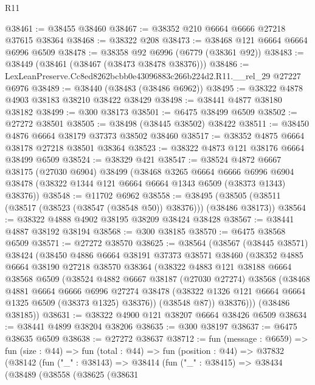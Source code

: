\begin{lexlean}{R11}
\begin{coremodule}
@38461 := @38455 @38460
@38467 := @38352 @210 @6664 @6666 @27218 @37615 @38364
@38468 := @38322 @208
@38473 := @38468 @121 @6664 @6664 @6996 @6509
@38478 := @38358 @92 @6996 (@6779 (@38361 @92))
@38483 := @38449 (@38461 (@38467 (@38473 @38478 @38376)))
@38486 := LexLeanPreserve.Cc8ed8262bcbb0e43096883c266b224d2.R11.__rel_29 @27227 @6976
@38489 := @38440 (@38483 (@38486 @6962))
@38495 := @38322 @4878 @4903 @38183 @38210 @38422 @38429
@38498 := @38441 @4877 @38180 @38182
@38499 := @300 @38173
@38501 := @6475 @38499 @6509
@38502 := @27272 @38501
@38505 := @38498 (@38445 @38502) @38422
@38511 := @38450 @4876 @6664 @38179 @37373 @38502 @38460
@38517 := @38352 @4875 @6664 @38178 @27218 @38501 @38364
@38523 := @38322 @4873 @121 @38176 @6664 @38499 @6509
@38524 := @38329 @421
@38547 := @38524
    @4872
    @6667
    @38175
    (@27030 @6904)
    @38499
    (@38468
      @3265
      @6664
      @6666
      @6996
      @6904
      @38478
      (@38322 @1344 @121 @6664 @6664 @1343 @6509 (@38373 @1343) @38376))
@38548 := @11702 @6962
@38558 := @38495 (@38505 (@38511 (@38517 (@38523 (@38547 (@38548 @50)) @38376))) (@38486 @38173))
@38564 := @38322 @4888 @4902 @38195 @38209 @38424 @38428
@38567 := @38441 @4887 @38192 @38194
@38568 := @300 @38185
@38570 := @6475 @38568 @6509
@38571 := @27272 @38570
@38625 := @38564
    (@38567
      (@38445 @38571)
      @38424
      (@38450
        @4886
        @6664
        @38191
        @37373
        @38571
        @38460
        (@38352
          @4885
          @6664
          @38190
          @27218
          @38570
          @38364
          (@38322
            @4883
            @121
            @38188
            @6664
            @38568
            @6509
            (@38524
              @4882
              @6667
              @38187
              (@27030 @27274)
              @38568
              (@38468
                @4881
                @6664
                @6666
                @6996
                @27274
                @38478
                (@38322 @1326 @121 @6664 @6664 @1325 @6509 (@38373 @1325) @38376))
              (@38548 @87))
            @38376)))
      (@38486 @38185))
@38631 := @38322 @4900 @121 @38207 @6664 @38426 @6509
@38634 := @38441 @4899 @38204 @38206
@38635 := @300 @38197
@38637 := @6475 @38635 @6509
@38638 := @27272 @38637
@38712 := fun (message : @6659) =>
  fun (size : @44) =>
  fun (total : @44) =>
  fun (position : @44) =>
  @37832
    (@38142
      (fun ("_" : @38143) =>
      @38414
        (fun ("_" : @38415) =>
        @38434
          (@38489
            (@38558
              (@38625
                (@38631

\end{coremodule}
\end{lexlean}
